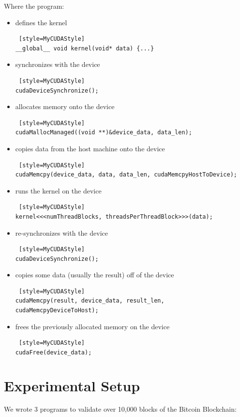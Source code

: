 \documentclass{article}
\begin{document}
Where the program:
\begin{itemize}
\item{} defines the kernel
\begin{lstlisting} [style=MyCUDAStyle]
__global__ void kernel(void* data) {...}
\end{lstlisting}
\item{} synchronizes with the device
\begin{lstlisting} [style=MyCUDAStyle]
cudaDeviceSynchronize();
\end{lstlisting}
\item{} allocates memory onto the device
\begin{lstlisting} [style=MyCUDAStyle]
cudaMallocManaged((void **)&device_data, data_len);
\end{lstlisting}
\item{} copies data from the host machine onto the device
\begin{lstlisting} [style=MyCUDAStyle]
cudaMemcpy(device_data, data, data_len, cudaMemcpyHostToDevice);
\end{lstlisting}
\item{} runs the kernel on the device
\begin{lstlisting} [style=MyCUDAStyle]
kernel<<<numThreadBlocks, threadsPerThreadBlock>>>(data);
\end{lstlisting}
\item{} re-synchronizes with the device
\begin{lstlisting} [style=MyCUDAStyle]
cudaDeviceSynchronize();
\end{lstlisting}
\item{} copies some data (usually the result) off of the device
\begin{lstlisting} [style=MyCUDAStyle]
cudaMemcpy(result, device_data, result_len, cudaMemcpyDeviceToHost);
\end{lstlisting}
\item{} frees the previously allocated memory on the device
\begin{lstlisting} [style=MyCUDAStyle]
cudaFree(device_data);
\end{lstlisting}
\end {itemize}

\section {Experimental Setup}

We wrote 3 programs to validate over 10,000 blocks of the Bitcoin Blockchain:
\end{document}
